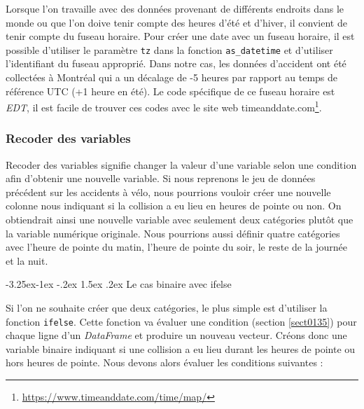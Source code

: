 \documentclass[
  11pt,
  french,
]{book}
\makeatletter
\newenvironment{Shaded}{\begin{snugshade}}{\end{snugshade}}
\newcommand{\DataTypeTok}[1]{\textcolor[rgb]{0.13,0.29,0.53}{#1}}
\newcommand{\KeywordTok}[1]{\textcolor[rgb]{0.13,0.29,0.53}{\textbf{#1}}}
\newcommand{\NormalTok}[1]{#1}
\newcommand{\OperatorTok}[1]{\textcolor[rgb]{0.81,0.36,0.00}{\textbf{#1}}}
\newcommand{\StringTok}[1]{\textcolor[rgb]{0.31,0.60,0.02}{#1}}
\renewcommand{\href}[2]{#2\footnote{\url{#1}}}
\newenvironment{kframe}{%
\medskip{}
\setlength{\fboxsep}{.8em}
 \def\at@end@of@kframe{}%
 \ifinner\ifhmode%
  \def\at@end@of@kframe{\end{minipage}}%
  \begin{minipage}{\columnwidth}%
 \fi\fi%
 \def\FrameCommand##1{\hskip\@totalleftmargin \hskip-\fboxsep
 \colorbox{shadecolor}{##1}\hskip-\fboxsep
     \hskip-\linewidth \hskip-\@totalleftmargin \hskip\columnwidth}%
 \MakeFramed {\advance\hsize-\width
   \@totalleftmargin\z@ \linewidth\hsize
   \@setminipage}}%
 {\par\unskip\endMakeFramed%
 \at@end@of@kframe}
\renewenvironment{Shaded}{\begin{kframe}}{\end{kframe}}
\renewcommand\paragraph{\@startsection{paragraph}{4}{\z@}%
   {-3.25ex\@plus -1ex \@minus -.2ex}%
   {1.5ex \@plus .2ex}%
   {\normalfont\normalsize\bfseries}}
\makeatother
\begin{document}
Lorsque l'on travaille avec des données provenant de différents endroits dans le monde ou que l'on doive tenir compte des heures d'été et d'hiver, il convient de tenir compte du fuseau horaire. Pour créer une date avec un fuseau horaire, il est possible d'utiliser le paramètre \texttt{tz} dans la fonction \texttt{as\_datetime} et d'utiliser l'identifiant du fuseau approprié. Dans notre cas, les données d'accident ont été collectées à Montréal qui a un décalage de -5 heures par rapport au temps de référence UTC (+1 heure en été). Le code spécifique de ce fuseau horaire est \emph{EDT}, il est facile de trouver ces codes avec le site web \href{https://www.timeanddate.com/time/map/}{timeanddate.com}.

\begin{Shaded}
\end{Shaded}

\hypertarget{sect01427}{%
\subsubsection{Recoder des variables}\label{sect01427}}

Recoder des variables signifie changer la valeur d'une variable selon une condition afin d'obtenir une nouvelle variable. Si nous reprenons le jeu de données précédent sur les accidents à vélo, nous pourrions vouloir créer une nouvelle colonne nous indiquant si la collision a eu lieu en heures de pointe ou non. On obtiendrait ainsi une nouvelle variable avec seulement deux catégories plutôt que la variable numérique originale. Nous pourrions aussi définir quatre catégories avec l'heure de pointe du matin, l'heure de pointe du soir, le reste de la journée et la nuit.

\hypertarget{sect014271}{%
\paragraph{Le cas binaire avec ifelse}\label{sect014271}}

Si l'on ne souhaite créer que deux catégories, le plus simple est d'utiliser la fonction \texttt{ifelse}. Cette fonction va évaluer une condition (section \ref{sect0135}) pour chaque ligne d'un \emph{DataFrame} et produire un nouveau vecteur. Créons donc une variable binaire indiquant si une collision a eu lieu durant les heures de pointe ou hors heures de pointe. Nous devons alors évaluer les conditions suivantes :
\end{document}
